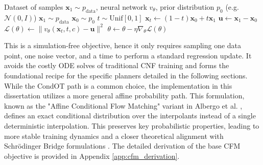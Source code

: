 \begin{algorithm}
\caption{CFM Training}\label{alg:cfm_training}
\begin{algorithmic}[1]
\Require Dataset of samples $\mathbf{x}_1 \sim p_{\text{data}}$, neural network $v_\theta$, prior distribution $p_0$ (e.g.\ $\mathcal{N}(0, I)$)
    \State $\mathbf{x}_1 \sim p_{\text{data}}$ 
    \State $\mathbf{x}_0 \sim p_{0}$ 
    \State $t \sim \text{Unif}[0,1]$ 
    \State $\mathbf{x}_t \gets (1-t)\mathbf{x}_0 + t\mathbf{x}_1$ 
    \State $\mathbf{u} \gets \mathbf{x}_1 - \mathbf{x}_0$ 
    \State $\mathcal{L}(\theta) \gets \|v_\theta(\mathbf{x}_t, t, c) - \mathbf{u}\|^2$ 
    \State $\theta \gets \theta - \eta \nabla_\theta \mathcal{L}(\theta)$ 
\EndFor
\end{algorithmic}
\end{algorithm}
This is a simulation-free objective, hence it only requires sampling one data point, one noise vector, and a time to perform a standard regression update. It avoids the costly ODE solves of traditional CNF training and forms the foundational recipe for the specific planners detailed in the following sections. While the CondOT path is a common choice, the implementation in this dissertation utilizes a more general affine probability path. This formulation, known as the "Affine Conditional Flow Matching" variant in Albergo et al. \cite{albergoStochasticInterpolantsUnifying2023}, defines an exact conditional distribution over the interpolants instead of a single deterministic interpolation. This preserves key probabilistic properties, leading to more stable training dynamics and a closer theoretical alignment with Schrödinger Bridge formulations \cite{tongSimulationfreeSchrodingerBridges2024}. The detailed derivation of the base CFM objective is provided in Appendix \ref{app:cfm_derivation}.

